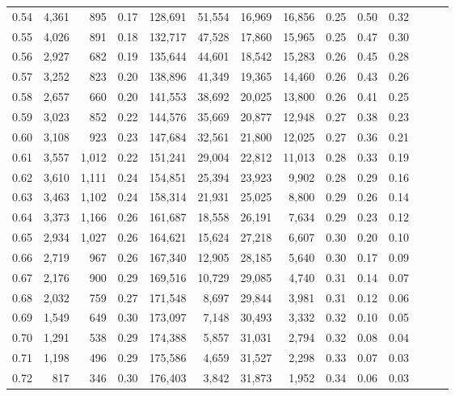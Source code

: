 \begin{tabular}{rrrrrrrrrrrrrr}
0.54 &  4,361 &    895 &  0.17 &  128,691 &   51,554 &  16,969 &  16,856 &  0.25 &  0.50 &      0.32 \\
0.55 &  4,026 &    891 &  0.18 &  132,717 &   47,528 &  17,860 &  15,965 &  0.25 &  0.47 &      0.30 \\
0.56 &  2,927 &    682 &  0.19 &  135,644 &   44,601 &  18,542 &  15,283 &  0.26 &  0.45 &      0.28 \\
0.57 &  3,252 &    823 &  0.20 &  138,896 &   41,349 &  19,365 &  14,460 &  0.26 &  0.43 &      0.26 \\
0.58 &  2,657 &    660 &  0.20 &  141,553 &   38,692 &  20,025 &  13,800 &  0.26 &  0.41 &      0.25 \\
0.59 &  3,023 &    852 &  0.22 &  144,576 &   35,669 &  20,877 &  12,948 &  0.27 &  0.38 &      0.23 \\
0.60 &  3,108 &    923 &  0.23 &  147,684 &   32,561 &  21,800 &  12,025 &  0.27 &  0.36 &      0.21 \\
0.61 &  3,557 &  1,012 &  0.22 &  151,241 &   29,004 &  22,812 &  11,013 &  0.28 &  0.33 &      0.19 \\
0.62 &  3,610 &  1,111 &  0.24 &  154,851 &   25,394 &  23,923 &   9,902 &  0.28 &  0.29 &      0.16 \\
0.63 &  3,463 &  1,102 &  0.24 &  158,314 &   21,931 &  25,025 &   8,800 &  0.29 &  0.26 &      0.14 \\
0.64 &  3,373 &  1,166 &  0.26 &  161,687 &   18,558 &  26,191 &   7,634 &  0.29 &  0.23 &      0.12 \\
0.65 &  2,934 &  1,027 &  0.26 &  164,621 &   15,624 &  27,218 &   6,607 &  0.30 &  0.20 &      0.10 \\
0.66 &  2,719 &    967 &  0.26 &  167,340 &   12,905 &  28,185 &   5,640 &  0.30 &  0.17 &      0.09 \\
0.67 &  2,176 &    900 &  0.29 &  169,516 &   10,729 &  29,085 &   4,740 &  0.31 &  0.14 &      0.07 \\
0.68 &  2,032 &    759 &  0.27 &  171,548 &    8,697 &  29,844 &   3,981 &  0.31 &  0.12 &      0.06 \\
0.69 &  1,549 &    649 &  0.30 &  173,097 &    7,148 &  30,493 &   3,332 &  0.32 &  0.10 &      0.05 \\
0.70 &  1,291 &    538 &  0.29 &  174,388 &    5,857 &  31,031 &   2,794 &  0.32 &  0.08 &      0.04 \\
0.71 &  1,198 &    496 &  0.29 &  175,586 &    4,659 &  31,527 &   2,298 &  0.33 &  0.07 &      0.03 \\
0.72 &    817 &    346 &  0.30 &  176,403 &    3,842 &  31,873 &   1,952 &  0.34 &  0.06 &      0.03 \\

\end{tabular}
